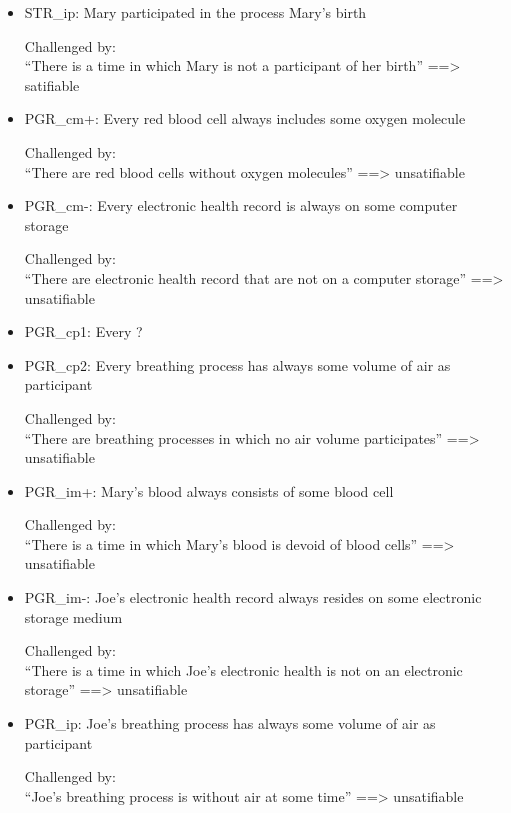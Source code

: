 \begin{itemize}
\item STR\_ip:  Mary participated in the process Mary's birth

Challenged by: \\``There is a time in which Mary is not a participant of her birth''  ==> satifiable



\item PGR\_cm+: Every red blood cell always includes some oxygen molecule 







Challenged by: \\``There are red blood cells without oxygen molecules''  ==> unsatifiable


\item PGR\_cm-: Every electronic health record is always on some computer storage

Challenged by: \\``There are electronic health record that are not on a computer storage''  ==> unsatifiable


\item PGR\_cp1: Every ?  
\item PGR\_cp2: Every breathing process has always some volume of air as participant 

Challenged by: \\``There are breathing processes in which no air volume participates''  ==> unsatifiable


\item PGR\_im+: Mary's blood always consists of some blood cell 

Challenged by: \\``There is a time in which Mary's blood is devoid of blood cells''  ==> unsatifiable

\item PGR\_im-: Joe's electronic health record always resides on some electronic storage medium

Challenged by: \\``There is a time in which Joe's electronic health is not on an electronic storage''  ==> unsatifiable


\item PGR\_ip:  Joe's breathing process has always some volume of air as participant

Challenged by: \\``Joe's breathing process is without air at some time''  ==> unsatifiable


\end{itemize}

